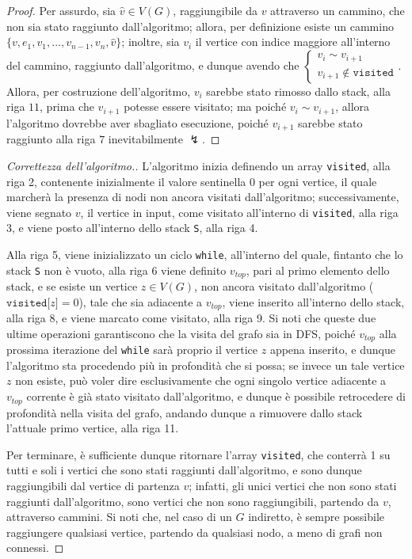 \documentclass[a4paper, 12pt]{report}
\begin{document}
    \begin{proof}
        Per assurdo, sia $\hat v \in V(G)$, raggiungibile da $v$ attraverso un cammino, che non sia stato raggiunto dall'algoritmo; allora, per definizione esiste un cammino $\{v, e_1, v_1, \ldots, v_{n - 1}, v_n, \hat v\}$; inoltre, sia $v_i$ il vertice con indice maggiore all'interno del cammino, raggiunto dall'algoritmo, e dunque avendo che $\left \{ \begin{array}{l}v_i \sim v_{i + 1} \\ v_{i + 1} \notin \texttt{visited}  \end{array} \right.$. Allora, per costruzione dell'algoritmo, $v_i$ sarebbe stato rimosso dallo stack, alla riga $11$, prima che $v_{i + 1}$ potesse essere visitato; ma poiché $v_i \sim v_{i +1}$, allora l'algoritmo dovrebbe aver sbagliato esecuzione, poiché $v_{i +1}$ sarebbe stato raggiunto alla riga $7$ inevitabilmente $\lightning$.
    \end{proof}

    \begin{proof}[Correttezza dell'algoritmo.]
        L'algoritmo inizia definendo un array \texttt{visited}, alla riga 2, contenente inizialmente il valore sentinella 0 per ogni vertice, il quale marcherà la presenza di nodi non ancora visitati dall'algoritmo; successivamente, viene segnato $v$, il vertice in input, come visitato all'interno di \texttt{visited}, alla riga 3, e viene posto all'interno dello stack \texttt{S}, alla riga 4.

        Alla riga 5, viene inizializzato un ciclo \texttt{while}, all'interno del quale, fintanto che lo stack \texttt{S} non è vuoto, alla riga 6 viene definito $v_{top}$, pari al primo elemento dello stack, e se esiste un vertice $z \in V(G)$, non ancora visitato dall'algoritmo ($\texttt{visited[}z\texttt{]}=0$), tale che sia adiacente a $v_{top}$, viene inserito all'interno dello stack, alla riga 8, e viene marcato come visitato, alla riga 9. Si noti che queste due ultime operazioni garantiscono che la visita del grafo sia in DFS, poiché $v_{top}$ alla prossima iterazione del \texttt{while} sarà proprio il vertice $z$ appena inserito, e dunque l'algoritmo sta procedendo più in profondità che si possa; se invece un tale vertice $z$ non esiste, può voler dire esclusivamente che ogni singolo vertice adiacente a $v_{top}$ corrente è già stato visitato dall'algoritmo, e dunque è possibile retrocedere di profondità nella visita del grafo, andando dunque a rimuovere dallo stack l'attuale primo vertice, alla riga 11.

        Per terminare, è sufficiente dunque ritornare l'array \texttt{visited}, che conterrà 1 su tutti e soli i vertici che sono stati raggiunti dall'algoritmo, e sono dunque raggiungibili dal vertice di partenza $v$; infatti, gli unici vertici che non sono stati raggiunti dall'algoritmo, sono vertici che non sono raggiungibili, partendo da $v$, attraverso cammini. Si noti che, nel caso di un $G$ indiretto, è sempre possibile raggiungere qualsiasi vertice, partendo da qualsiasi nodo, a meno di grafi non connessi.
    \end{proof}
\end{document}
